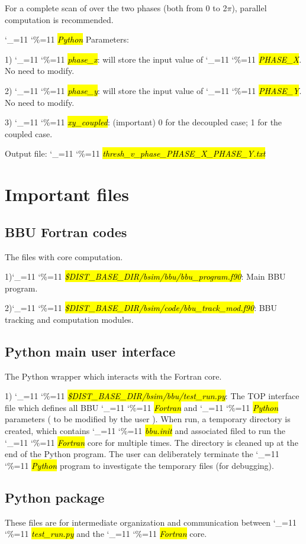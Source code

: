 \documentclass{hitec}
\newcommand\dottcmd[1]{\hl{\em#1}\endgroup}
\newcommand{\vn}{\begingroup\catcode`\_=11 \catcode`\%=11 \dottcmd}
\begin{document}
{For a complete scan of over the two phases (both from 0 to 2$\pi$), parallel computation is recommended. 

\bigbreak
\vn{Python} Parameters:

1) \vn{phase_x}: will store the input value of \vn{PHASE_X}. No need to modify.

2) \vn{phase_y}: will store the input value of \vn{PHASE_Y}. No need to modify.

3) \vn{xy_coupled}: (important) 0 for the decoupled case; 1 for the coupled case. 


\bigbreak     
Output file: \vn{thresh_v_phase_PHASE_X_PHASE_Y.txt} 

\section{Important files}
\subsection{BBU Fortran codes}
The files with core computation.

1)\vn{\$DIST_BASE_DIR/bsim/bbu/bbu_program.f90}: Main BBU program.

2)\vn{\$DIST_BASE_DIR/bsim/code/bbu_track_mod.f90}: BBU tracking and computation modules.

\subsection{ Python main user interface }
The Python wrapper which interacts with the Fortran core.

1) \vn{\$DIST_BASE_DIR/bsim/bbu/test_run.py}: 
The TOP interface file which defines all BBU \vn{Fortran} and \vn{Python} parameters ( to be modified by the user ).
When run, a temporary directory is created, which contains \vn{bbu.init} and associated filed to run the \vn{Fortran} core for multiple times. The directory is cleaned up at the end of the Python program. The user can deliberately terminate the \vn{Python} program to investigate the temporary files (for debugging).


\subsection{Python package}
These files are for intermediate  organization and communication between \vn{test_run.py} and the \vn{Fortran} core.

}
\end{document}
